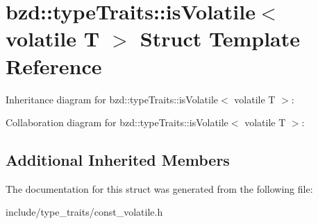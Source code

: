 \hypertarget{structbzd_1_1typeTraits_1_1isVolatile_3_01volatile_01T_01_4}{}\section{bzd\+:\+:type\+Traits\+:\+:is\+Volatile$<$ volatile T $>$ Struct Template Reference}
\label{structbzd_1_1typeTraits_1_1isVolatile_3_01volatile_01T_01_4}


Inheritance diagram for bzd\+:\+:type\+Traits\+:\+:is\+Volatile$<$ volatile T $>$\+:


Collaboration diagram for bzd\+:\+:type\+Traits\+:\+:is\+Volatile$<$ volatile T $>$\+:
\subsection*{Additional Inherited Members}


The documentation for this struct was generated from the following file\+:\begin{DoxyCompactItemize}
\item 
include/type\+\_\+traits/const\+\_\+volatile.\+h\end{DoxyCompactItemize}
